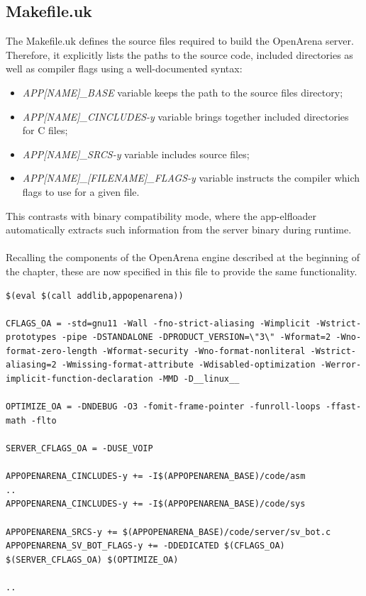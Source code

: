 \subsection{Makefile.uk}
The Makefile.uk defines the source files required to build the OpenArena server.\@
Therefore, it explicitly lists the paths to the source code, included directories as well as compiler flags using a well-documented syntax:
\begin{itemize}
    \item \textit{APP[NAME]_BASE} variable keeps the path to the source files directory;
    \item \textit{APP[NAME]_CINCLUDES-y} variable brings together included directories for C files;
    \item \textit{APP[NAME]_SRCS-y} variable includes source files;
    \item \textit{APP[NAME]_[FILENAME]_FLAGS-y} variable instructs the compiler which flags to use for a given file.
\end{itemize}
This contrasts with binary compatibility mode, where the app-elfloader automatically extracts such information from the server binary during runtime. \\ \\
Recalling the components of the OpenArena engine described at the beginning of the chapter, these are now specified in this file to provide the same functionality.
\\
\lstset{basicstyle=\small\ttfamily, caption=Part of Makefile.uk, language=make, showstringspaces=false, keepspaces=true}
\begin{lstlisting}
$(eval $(call addlib,appopenarena))

CFLAGS_OA = -std=gnu11 -Wall -fno-strict-aliasing -Wimplicit -Wstrict-prototypes -pipe -DSTANDALONE -DPRODUCT_VERSION=\"3\" -Wformat=2 -Wno-format-zero-length -Wformat-security -Wno-format-nonliteral -Wstrict-aliasing=2 -Wmissing-format-attribute -Wdisabled-optimization -Werror-implicit-function-declaration -MMD -D__linux__

OPTIMIZE_OA = -DNDEBUG -O3 -fomit-frame-pointer -funroll-loops -ffast-math -flto

SERVER_CFLAGS_OA = -DUSE_VOIP

APPOPENARENA_CINCLUDES-y += -I$(APPOPENARENA_BASE)/code/asm
..
APPOPENARENA_CINCLUDES-y += -I$(APPOPENARENA_BASE)/code/sys

APPOPENARENA_SRCS-y += $(APPOPENARENA_BASE)/code/server/sv_bot.c
APPOPENARENA_SV_BOT_FLAGS-y += -DDEDICATED $(CFLAGS_OA) $(SERVER_CFLAGS_OA) $(OPTIMIZE_OA)

..
\end{lstlisting}
\\
\newpage

